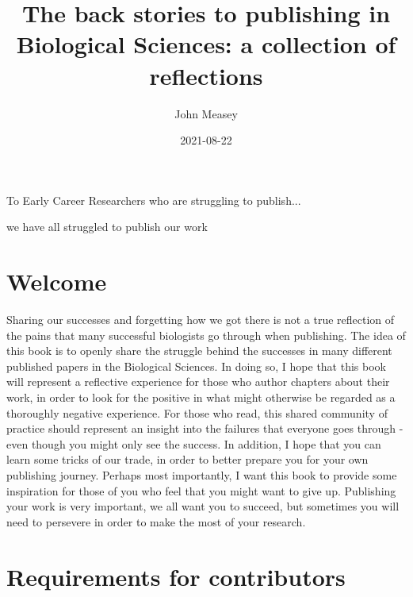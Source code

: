 \documentclass[
]{krantz}
\title{The back stories to publishing in Biological Sciences: a collection of reflections}
\author{John Measey}
\date{2021-08-22}
\begin{document}
\maketitle


\thispagestyle{empty}

\begin{center}
To Early Career Researchers who are struggling to publish...

we have all struggled to publish our work
\end{center}

\setlength{\abovedisplayskip}{-5pt}
\setlength{\abovedisplayshortskip}{-5pt}

{
\hypersetup{linkcolor=}
\setcounter{tocdepth}{2}
\tableofcontents
}
\listoftables
\listoffigures
\hypertarget{welcome}{%
\chapter*{Welcome}\label{welcome}}


Sharing our successes and forgetting how we got there is not a true
reflection of the pains that many successful biologists go through when
publishing. The idea of this book is to openly share the struggle behind
the successes in many different published papers in the Biological
Sciences. In doing so, I hope that this book will represent a reflective
experience for those who author chapters about their work, in order to
look for the positive in what might otherwise be regarded as a
thoroughly negative experience. For those who read, this shared
community of practice should represent an insight into the failures that
everyone goes through - even though you might only see the success. In
addition, I hope that you can learn some tricks of our trade, in order
to better prepare you for your own publishing journey. Perhaps most
importantly, I want this book to provide some inspiration for those of
you who feel that you might want to give up. Publishing your work is
very important, we all want you to succeed, but sometimes you will need
to persevere in order to make the most of your research.

\hypertarget{requirements-for-contributors}{%
\chapter*{Requirements for contributors}\label{requirements-for-contributors}}
\end{document}
